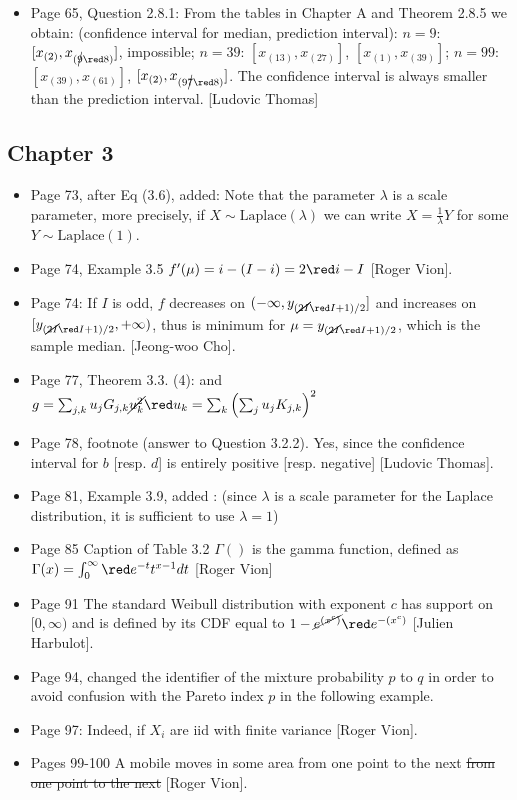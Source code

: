 \documentclass[11pt,twoside,onecolumn,a4paper]{article}
\newcommand{\cor}[2]{\cancel{#1} {\red #2}}
\begin{document}
\begin{itemize}
\item Page 65, Question 2.8.1: From the tables in Chapter A and Theorem 2.8.5 we obtain:
 (confidence interval for median, prediction interval):
 $n=9$: $[x_{(2)},x_{(\cor{9}{8})}]$, impossible;
 $n=39$: $[x_{(13)},x_{(27)}]$, $[x_{(1)},x_{(39)}]$;
 $n=99$: $[x_{(39)},x_{(61)}]$, $[x_{(2)},x_{(9\cor{7}{8})}]$.
 The confidence interval is always smaller than the prediction interval. [Ludovic Thomas]
 \end{itemize}
 \subsection*{Chapter 3}
 \begin{itemize}
    \item Page 73, after Eq (3.6), added: Note that the parameter $\lambda$ is a scale parameter, more precisely, if $X
\sim \mbox{
 Laplace}(\lambda)$ we can write $X=\frac1{\lambda} Y$ for some $Y
\sim \mbox{
 Laplace}(1)$.
 \item Page 74, Example 3.5 $f'(\mu) = i - (I-i)= 2{\red i}-I$ [Roger Vion].
 \item Page 74: If $I$ is odd, $f$
decreases on $(-\infty, y_{(\cor{2I}{I}+1)/2}]$ and increases on
$[y_{(\cor{2I}{I}+1)/2}, +\infty)$, thus is minimum for $\mu=
y_{(\cor{2I}{I}+1)/2}$, which is the sample median.  [Jeong-woo Cho].
\item Page 77, Theorem 3.3. (4): and $g=\sum_{j,k}u_jG_{j,k}\cor{u_k^2}{u_k}=\sum_k\lp\sum_j u_j K_{j,k}\rp^2$
\item Page 78, footnote (answer to Question 3.2.2). Yes, since the confidence
 interval for  \cor{$d$}{$b$ [resp. $d$]} is entirely positive [resp. negative] [Ludovic Thomas].
\item Page 81, Example 3.9, added : (since $\lambda$ is a scale parameter for the Laplace distribution, it is sufficient to use $\lambda=1$)
\item Page 85 Caption of Table 3.2 $\Gamma()$ is
the gamma function, defined as $\Gamma(x)=\int_0^{\infty}{\red e^{-t} }
t^{x-1} dt$ [Roger Vion]
\item Page 91 The standard Weibull distribution with exponent $c$
has support on $[0,\infty ) $ and is defined by its CDF equal
to $1-\cor{e^{\lp  x ^c \rp}}{e^{-\lp  x ^c \rp}}$ [Julien Harbulot].
\item Page 94, changed the identifier of the mixture probability $p$ to $q$ in order to avoid confusion with the Pareto index $p$ in the following example.
\item Page 97: Indeed, if $X_i$ are \cor{idd}{iid} with finite variance [Roger Vion].
 \item Pages 99-100 A mobile moves in some area
from one point to the next \sout{from one point to the next} [Roger Vion].
\end{itemize}
\end{document}
